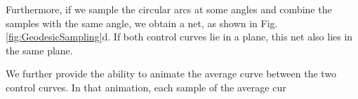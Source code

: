 \documentclass[journal, letterpaper]{IEEEtran}
\begin{document}
Furthermore, if we sample the circular arcs at some angles and combine the samples with the same angle, we obtain a net, as shown in Fig.\ref{fig:GeodesicSampling}d. If both control curves lie in a plane, this net also lies in the same plane.

We further provide the ability to animate the average curve between the two control curves. In that animation, each sample of the average cur
\end{document}
